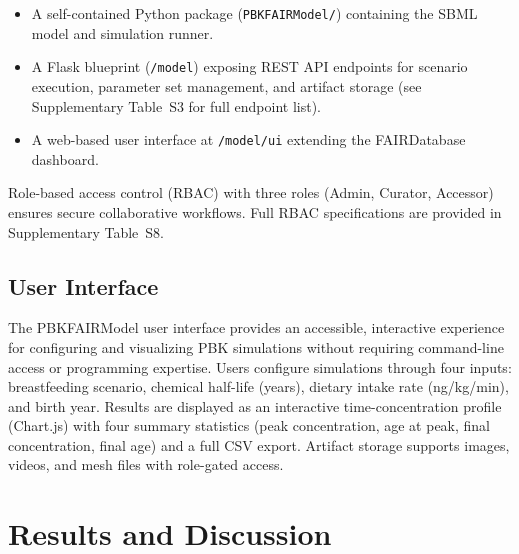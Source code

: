 \documentclass[preprint,12pt]{elsarticle}
\begin{document}
\begin{linenumbers}
\begin{itemize}
  \item A self-contained Python package (\texttt{PBKFAIRModel/})
        containing the SBML model and simulation runner.
  \item A Flask blueprint (\texttt{/model}) exposing REST API endpoints
        for scenario execution, parameter set management, and artifact
        storage (see Supplementary Table~S3 for full endpoint list).
  \item A web-based user interface at \texttt{/model/ui} extending
        the FAIRDatabase dashboard.
\end{itemize}

Role-based access control (RBAC) with three roles (Admin, Curator,
Accessor) ensures secure collaborative workflows. Full RBAC
specifications are provided in Supplementary Table~S8.

\subsection{User Interface}


The PBKFAIRModel user interface provides an accessible, interactive
experience for configuring and visualizing PBK simulations without
requiring command-line access or programming expertise. Users configure
simulations through four inputs: breastfeeding scenario, chemical
half-life (years), dietary intake rate (ng/kg/min), and birth year.
Results are displayed as an interactive time-concentration profile
(Chart.js) with four summary statistics (peak concentration, age at
peak, final concentration, final age) and a full CSV export. Artifact
storage supports images, videos, and mesh files with role-gated access.

\section{Results and Discussion}\label{sec3}



\end{linenumbers}
\end{document}
